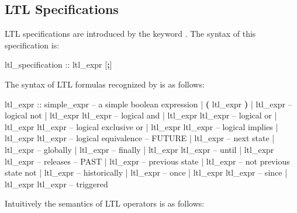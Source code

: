 \subsection{LTL Specifications}
\label{LTL Specifications}
%
LTL specifications are introduced by the keyword
. 
%
The syntax of this specification is:
%
\begin{Grammar}
ltl_specification ::  ltl_expr [\textbf{;}]
\end{Grammar}
%
The syntax of LTL formulas recognized by \nusmv is as follows:
\begin{Grammar}
ltl_expr ::
    simple_expr              -- a simple boolean expression
    | \textbf{(} ltl_expr \textbf{)}
    | \operator{!} ltl_expr             -- logical not
    | ltl_expr \operator{\&} ltl_expr    -- logical and
    | ltl_expr \operator{|} ltl_expr    -- logical or
    | ltl_expr  ltl_expr  -- logical exclusive or
    | ltl_expr \operator{->} ltl_expr   -- logical implies
    | ltl_expr \operator{<->} ltl_expr  -- logical equivalence
    -- FUTURE
    |  ltl_expr             -- next state
    |  ltl_expr             -- globally
    |  ltl_expr             -- finally
    | ltl_expr  ltl_expr    -- until
    | ltl_expr  ltl_expr    -- releases
    -- PAST
    |  ltl_expr             -- previous state
    |  ltl_expr             -- not previous state not
    |  ltl_expr             -- historically
    |  ltl_expr             -- once 
    | ltl_expr  ltl_expr    -- since
    | ltl_expr  ltl_expr    -- triggered
\end{Grammar}
%
Intuitively the semantics of LTL operators is as follows:
% 
